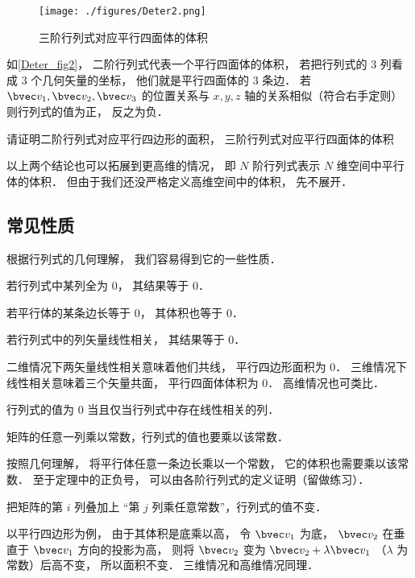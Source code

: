 \begin{figure}[ht]
\centering
\texttt{[image: ./figures/Deter2.png]}
\caption{三阶行列式对应平行四面体的体积} \label{Deter_fig2}
\end{figure}
如\autoref{Deter_fig2}， 二阶行列式代表一个平行四面体的体积， 若把行列式的 3 列看成 3 个几何矢量的坐标， 他们就是平行四面体的 3 条边． 若 $\bvec v_1, \bvec v_2, \bvec v_3$ 的位置关系与 $x, y, z$ 轴的关系相似（符合右手定则） 则行列式的值为正， 反之为负．

\begin{exercise}{}
请证明二阶行列式对应平行四边形的面积， 三阶行列式对应平行四面体的体积
\end{exercise}

以上两个结论也可以拓展到更高维的情况， 即 $N$ 阶行列式表示 $N$ 维空间中平行体的体积． 但由于我们还没严格定义高维空间中的体积， 先不展开．

\subsection{常见性质}
根据行列式的几何理解， 我们容易得到它的一些性质．

\begin{theorem}{ } \label{Deter_the1}
若行列式中某列全为 0， 其结果等于 0．
\end{theorem}
若平行体的某条边长等于 0， 其体积也等于 0．

\begin{theorem}{ }
若行列式中的列矢量线性相关， 其结果等于 0．
\end{theorem}
二维情况下两矢量线性相关意味着他们共线， 平行四边形面积为 0． 三维情况下线性相关意味着三个矢量共面， 平行四面体体积为 0． 高维情况也可类比．

\begin{theorem}{ } \label{Deter_the2}
行列式的值为 0 当且仅当行列式中存在线性相关的列．
\end{theorem}

\begin{theorem}{ } \label{Deter_the3}
矩阵的任意一列乘以常数，行列式的值也要乘以该常数．
\end{theorem}
按照几何理解， 将平行体任意一条边长乘以一个常数， 它的体积也需要乘以该常数． 至于定理中的正负号， 可以由各阶行列式的定义证明（留做练习）．

\begin{theorem}{ }
把矩阵的第 $i$ 列叠加上 “第 $j$ 列乘任意常数”，行列式的值不变．
\end{theorem}
以平行四边形为例， 由于其体积是底乘以高， 令 $\bvec v_1$ 为底， $\bvec v_2$ 在垂直于 $\bvec v_1$ 方向的投影为高， 则将 $\bvec v_2$ 变为 $\bvec v_2 + \lambda \bvec v_1$ （$\lambda$ 为常数）后高不变， 所以面积不变． 三维情况和高维情况同理．

